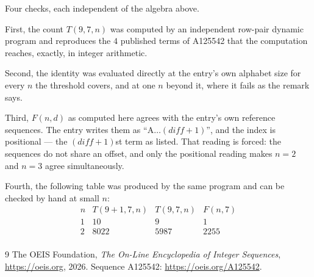 \documentclass[11pt,a4paper]{article}
\theoremstyle{plain}
\theoremstyle{definition}
\begin{document}
Four checks, each independent of the algebra above.

First, the count $T(9,7,n)$ was computed by an independent row-pair dynamic program and
reproduces the $4$ published terms of A125542 that the computation reaches,
exactly, in integer arithmetic.

Second, the identity was evaluated directly at the entry's own alphabet size for every $n$ the
threshold covers, and at one $n$ beyond it, where it fails as the remark says.

Third, $F(n,d)$ as computed here agrees with the entry's own reference sequences. The entry
writes them as ``$\mathrm{A}\dots(\mathit{diff}+1)$'', and the index is positional --- the
$(\mathit{diff}+1)$st term as listed. That reading is forced: the sequences do not share an
offset, and only the positional reading makes $n=2$ and $n=3$ agree simultaneously.

Fourth, the following table was produced by the same program and can be checked by hand at
small $n$:
\[
\begin{array}{rrrr}
n & T(9+1,7,n) & T(9,7,n) & F(n,7) \\ \hline
1 & 10 & 9 & 1 \\
2 & 8022 & 5987 & 2255 \\
\end{array}
\]

\begin{thebibliography}{9}
 The OEIS Foundation, \emph{The On-Line Encyclopedia of Integer Sequences},
\url{https://oeis.org}, 2026. Sequence A125542: \url{https://oeis.org/A125542}.
\end{thebibliography}
\end{document}
